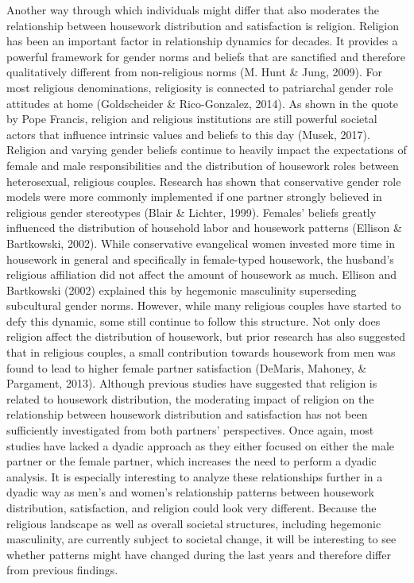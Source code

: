 \documentclass[
  man,floatsintext]{apa6}
\begin{document}
Another way through which individuals might differ that also moderates the relationship between housework distribution and satisfaction is religion. Religion has been an important factor in relationship dynamics for decades. It provides a powerful framework for gender norms and beliefs that are sanctified and therefore qualitatively different from non-religious norms (M. Hunt \& Jung, 2009). For most religious denominations, religiosity is connected to patriarchal gender role attitudes at home (Goldscheider \& Rico-Gonzalez, 2014). As shown in the quote by Pope Francis, religion and religious institutions are still powerful societal actors that influence intrinsic values and beliefs to this day (Musek, 2017). Religion and varying gender beliefs continue to heavily impact the expectations of female and male responsibilities and the distribution of housework roles between heterosexual, religious couples. Research has shown that conservative gender role models were more commonly implemented if one partner strongly believed in religious gender stereotypes (Blair \& Lichter, 1999). Females' beliefs greatly influenced the distribution of household labor and housework patterns (Ellison \& Bartkowski, 2002). While conservative evangelical women invested more time in housework in general and specifically in female-typed housework, the husband's religious affiliation did not affect the amount of housework as much. Ellison and Bartkowski (2002) explained this by hegemonic masculinity superseding subcultural gender norms. However, while many religious couples have started to defy this dynamic, some still continue to follow this structure. Not only does religion affect the distribution of housework, but prior research has also suggested that in religious couples, a small contribution towards housework from men was found to lead to higher female partner satisfaction (DeMaris, Mahoney, \& Pargament, 2013). Although previous studies have suggested that religion is related to housework distribution, the moderating impact of religion on the relationship between housework distribution and satisfaction has not been sufficiently investigated from both partners' perspectives. Once again, most studies have lacked a dyadic approach as they either focused on either the male partner or the female partner, which increases the need to perform a dyadic analysis. It is especially interesting to analyze these relationships further in a dyadic way as men's and women's relationship patterns between housework distribution, satisfaction, and religion could look very different. Because the religious landscape as well as overall societal structures, including hegemonic masculinity, are currently subject to societal change, it will be interesting to see whether patterns might have changed during the last years and therefore differ from previous findings.
\end{document}
